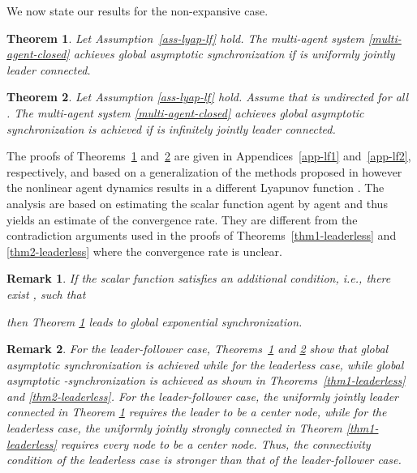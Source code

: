 \documentclass[a4paper, 11pt]{article}
\newtheorem{theorem}{Theorem}
\newtheorem{remark}{Remark}
\begin{document}
We now state our results for the non-expansive case.

\begin{theorem}\label{thm1-leader}
Let Assumption~\ref{ass-lyap-lf} hold.
The multi-agent system \eqref{multi-agent-closed} achieves global asymptotic synchronization if  is uniformly jointly leader connected.
\end{theorem}

\begin{theorem}\label{thm2-leader}
Let Assumption \ref{ass-lyap-lf} hold.
Assume that  is undirected for all .
The multi-agent system \eqref{multi-agent-closed} achieves global asymptotic synchronization is achieved if  is infinitely jointly leader connected.
\end{theorem}

The proofs of Theorems~\ref{thm1-leader} and~\ref{thm2-leader} are given in Appendices~\ref{app-lf1} and~\ref{app-lf2}, respectively, and based on a generalization of the methods proposed in
\cite{moreau,shi-johansson-siam} however the nonlinear agent dynamics results in a different Lyapunov function . The analysis are based on estimating the scalar function  agent by agent and thus yields an estimate of the convergence rate. They are different from the contradiction arguments used in the proofs of Theorems~\ref{thm1-leaderless} and \ref{thm2-leaderless} where the convergence rate is unclear.

\begin{remark}\label{remark-exponential}
If the scalar function  satisfies an additional condition, i.e.,
there exist , such that

then Theorem \ref{thm1-leader} leads to global exponential synchronization.
\end{remark}

\begin{remark}
For the leader-follower case, Theorems~\ref{thm1-leader} and \ref{thm2-leader} show that
global asymptotic synchronization is achieved while for the leaderless case, while global asymptotic -synchronization is achieved as shown in Theorems~\ref{thm1-leaderless} and \ref{thm2-leaderless}. For the leader-follower case,
the uniformly jointly leader connected in Theorem \ref{thm1-leader}
requires the leader to be a center node, while for the leaderless case, the uniformly jointly strongly connected
in Theorem \ref{thm1-leaderless} requires every node to be a center node.
Thus, the connectivity condition of the leaderless case is stronger than that of the leader-follower case.
\end{remark}
\end{document}
